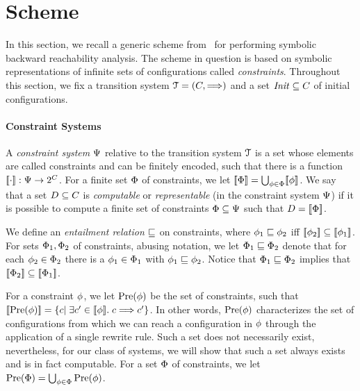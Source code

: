 \section{Scheme}
\label{sec:scheme}
%
In this section, we recall a generic scheme from~\cite{Parosh:Bengt:Karlis:Tsay:general}
for performing symbolic backward reachability analysis.
%
The scheme in question is based on symbolic representations of infinite sets of 
configurations called \emph{constraints}.
%
Throughout this section, we fix a transition system ${\EuScript T}=\left(C,\stackrel{}\Longrightarrow\right)$ and a set 
${\it Init}\subseteq C$ of initial configurations.
%

\paragraph{\bf Constraint Systems}
%
A \emph{constraint system} $\Psi$ relative to the transition system ${\EuScript T}$ is
a set whose elements are called constraints and can be finitely encoded, such that there 
is a function $[\![{\cdot}]\!]:\Psi\to 2^C$.
%
For a finite set $\Phi$ of constraints, we let $[\![{\Phi}]\!]=\bigcup_{
\phi\in\Phi}[\![{\phi}]\!]$.
%
We say that a set $D\subseteq C$ is \emph{computable} or \emph{representable} 
(in the constraint system $\Psi$) if it is possible to compute a finite set 
of constraints $\Phi\subseteq\Psi$ such that $D=[\![{\Phi}]\!]$.
%

We define an \emph{entailment relation $\sqsubseteq$} on constraints, where $\phi_1
\sqsubseteq\phi_2$ iff $[\![{\phi_2}]\!]\subseteq [\![{\phi_1}]\!]$.
%
For sets $\Phi_1,\Phi_2$ of constraints, abusing notation, we let $\Phi_1
\sqsubseteq\Phi_2$ denote that for each $\phi_2\in\Phi_2$ there is a $\phi_1
\in\Phi_1$ with $\phi_1\sqsubseteq\phi_2$.
%
Notice that $\Phi_1\sqsubseteq\Phi_2$ implies that $[\![{\Phi_2}]\!]
\subseteq[\![{\Phi_1}]\!]$.
%

For a constraint $\phi$, we let $\text{Pre}({\phi})$ be the set of constraints, 
such that $[\![{\text{Pre}({\phi})}]\!]=\left\{c|\;\exists c'\in[\![{
\phi}]\!].\;c\stackrel{}\Longrightarrow c'\right\}$.
%
In other words, $\text{Pre}({\phi})$ characterizes the set of configurations from
which we can reach a configuration in $\phi$ through the application of a 
single rewrite rule.
%
Such a set does not necessarily exist, nevertheless, for our class of systems, we will 
show that such a set always exists and is in fact computable.
%
For a set $\Phi$ of constraints, we let $\text{Pre}({\Phi})=\bigcup_{\phi\in
\Phi}\text{Pre}({\phi})$.
%

